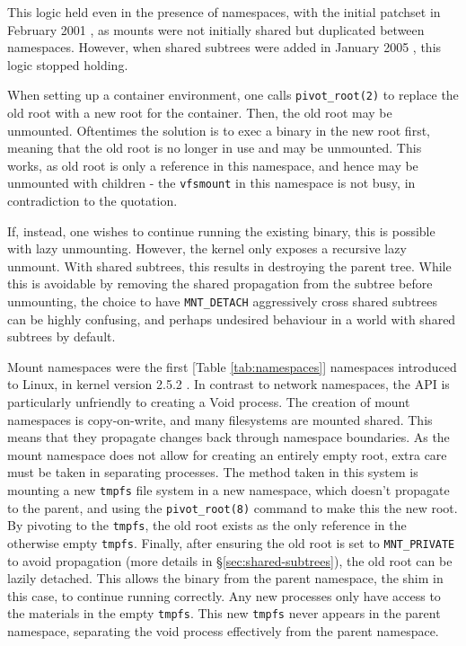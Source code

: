 \documentclass[sigplan]{acmart}
\begin{document}

This logic held even in the presence of namespaces, with the initial patchset in February 2001 \citep{viro_patch_2001}, as mounts were not initially shared but duplicated between namespaces. However, when shared subtrees were added in January 2005 \citep{viro_rfc_2005}, this logic stopped holding.

When setting up a container environment, one calls \texttt{pivot\_root(2)} to replace the old root with a new root for the container. Then, the old root may be unmounted. Oftentimes the solution is to exec a binary in the new root first, meaning that the old root is no longer in use and may be unmounted. This works, as old root is only a reference in this namespace, and hence may be unmounted with children - the \texttt{vfsmount} in this namespace is not busy, in contradiction to the quotation.

If, instead, one wishes to continue running the existing binary, this is possible with lazy unmounting. However, the kernel only exposes a recursive lazy unmount. With shared subtrees, this results in destroying the parent tree. While this is avoidable by removing the shared propagation from the subtree before unmounting, the choice to have \texttt{MNT\_DETACH} aggressively cross shared subtrees can be highly confusing, and perhaps undesired behaviour in a world with shared subtrees by default.

Mount namespaces were the first [Table \ref{tab:namespaces}] namespaces introduced to Linux, in kernel version 2.5.2 \citep{torvalds_linux_2002}. In contrast to network namespaces, the API is particularly unfriendly to creating a Void process. The creation of mount namespaces is copy-on-write, and many filesystems are mounted shared. This means that they propagate changes back through namespace boundaries. As the mount namespace does not allow for creating an entirely empty root, extra care must be taken in separating processes. The method taken in this system is mounting a new \texttt{tmpfs} file system in a new namespace, which doesn't propagate to the parent, and using the \texttt{pivot\_root(8)} command to make this the new root. By pivoting to the \texttt{tmpfs}, the old root exists as the only reference in the otherwise empty \texttt{tmpfs}. Finally, after ensuring the old root is set to \texttt{MNT\_PRIVATE} to avoid propagation (more details in §\ref{sec:shared-subtrees}), the old root can be lazily detached. This allows the binary from the parent namespace, the shim in this case, to continue running correctly. Any new processes only have access to the materials in the empty \texttt{tmpfs}. This new \texttt{tmpfs} never appears in the parent namespace, separating the void process effectively from the parent namespace.
\end{document}
